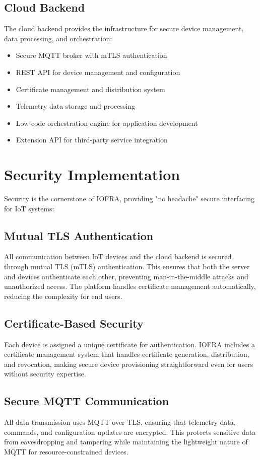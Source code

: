 \documentclass[conference]{IEEEtran}
\begin{document}
\subsection{Cloud Backend}
The cloud backend provides the infrastructure for secure device management, data processing, and orchestration:

\begin{itemize}
    \item Secure MQTT broker with mTLS authentication
    \item REST API for device management and configuration
    \item Certificate management and distribution system
    \item Telemetry data storage and processing
    \item Low-code orchestration engine for application development
    \item Extension API for third-party service integration
\end{itemize}

\section{Security Implementation}
Security is the cornerstone of IOFRA, providing "no headache" secure interfacing for IoT systems:

\subsection{Mutual TLS Authentication}
All communication between IoT devices and the cloud backend is secured through mutual TLS (mTLS) authentication. This ensures that both the server and devices authenticate each other, preventing man-in-the-middle attacks and unauthorized access. The platform handles certificate management automatically, reducing the complexity for end users.

\subsection{Certificate-Based Security}
Each device is assigned a unique certificate for authentication. IOFRA includes a certificate management system that handles certificate generation, distribution, and revocation, making secure device provisioning straightforward even for users without security expertise.

\subsection{Secure MQTT Communication}
All data transmission uses MQTT over TLS, ensuring that telemetry data, commands, and configuration updates are encrypted. This protects sensitive data from eavesdropping and tampering while maintaining the lightweight nature of MQTT for resource-constrained devices.
\end{document}
